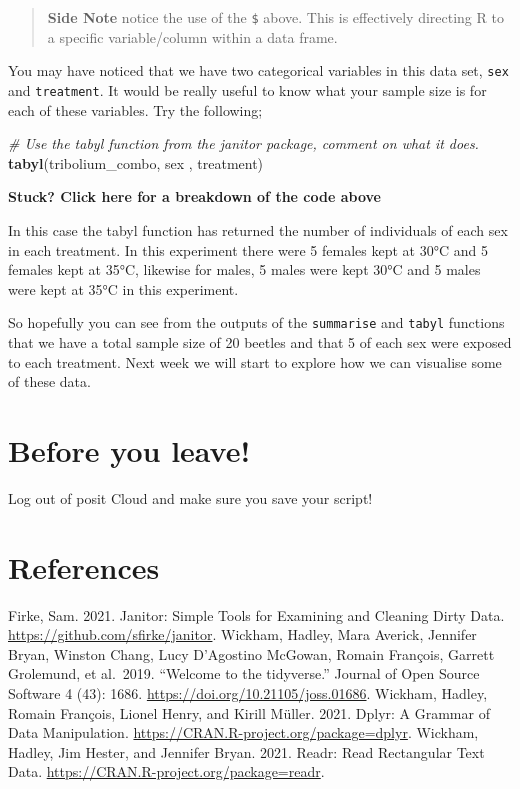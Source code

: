 \documentclass[
]{book}
\newenvironment{Shaded}{\begin{snugshade}}{\end{snugshade}}
\newcommand{\CommentTok}[1]{\textcolor[rgb]{0.56,0.35,0.01}{\textit{#1}}}
\newcommand{\FunctionTok}[1]{\textcolor[rgb]{0.13,0.29,0.53}{\textbf{#1}}}
\newcommand{\NormalTok}[1]{#1}
\begin{document}
\begin{quote}
\textbf{Side Note} notice the use of the \texttt{\$} above. This is effectively directing R to a specific variable/column within a data frame.
\end{quote}

You may have noticed that we have two categorical variables in this data set, \texttt{sex} and \texttt{treatment}. It would be really useful to know what your sample size is for each of these variables. Try the following;

\begin{Shaded}
\begin{Highlighting}[]
\CommentTok{\# Use the tabyl function from the janitor package, comment on what it does. }
\FunctionTok{tabyl}\NormalTok{(tribolium\_combo, sex , treatment)}
\end{Highlighting}
\end{Shaded}

\textbf{Stuck? Click here for a breakdown of the code above}

In this case the tabyl function has returned the number of individuals of each sex in each treatment. In this experiment there were 5 females kept at 30°C and 5 females kept at 35°C, likewise for males, 5 males were kept 30°C and 5 males were kept at 35°C in this experiment.

So hopefully you can see from the outputs of the \texttt{summarise} and \texttt{tabyl} functions that we have a total sample size of 20 beetles and that 5 of each sex were exposed to each treatment. Next week we will start to explore how we can visualise some of these data.

\hypertarget{before-you-leave-1}{%
\section{Before you leave!}\label{before-you-leave-1}}

Log out of posit Cloud and make sure you save your script!

\hypertarget{references-2}{%
\section{References}\label{references-2}}

Firke, Sam. 2021. Janitor: Simple Tools for Examining and Cleaning Dirty Data. \url{https://github.com/sfirke/janitor}.
Wickham, Hadley, Mara Averick, Jennifer Bryan, Winston Chang, Lucy D'Agostino McGowan, Romain François, Garrett Grolemund, et al.~2019. ``Welcome to the tidyverse.'' Journal of Open Source Software 4 (43): 1686. \url{https://doi.org/10.21105/joss.01686}.
Wickham, Hadley, Romain François, Lionel Henry, and Kirill Müller. 2021. Dplyr: A Grammar of Data Manipulation. \url{https://CRAN.R-project.org/package=dplyr}.
Wickham, Hadley, Jim Hester, and Jennifer Bryan. 2021. Readr: Read Rectangular Text Data. \url{https://CRAN.R-project.org/package=readr}.
\end{document}
